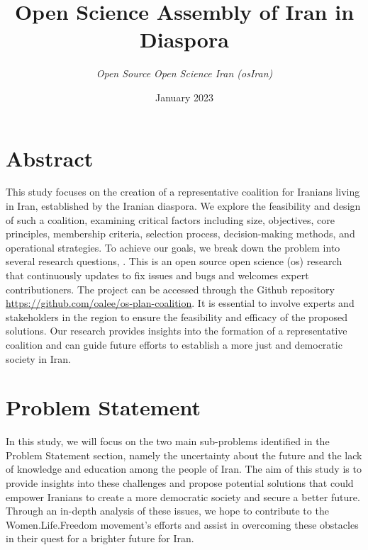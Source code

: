 \documentclass{IEEEtran}
\title{ \Huge \textbf{Open Science Assembly of Iran in Diaspora} \\[0.5cm]}
\author{

\textit{Open Source Open Science Iran (osIran)} \\
}
\date{January 2023}
\newcommand{\note}[1]{\todo[inline]{#1}}
\begin{document}
\maketitle




\section{Abstract}
This study focuses on the creation of a representative coalition for Iranians living in Iran, established by the Iranian diaspora.
We explore the feasibility and design of such a coalition, examining critical factors including size, objectives, core principles, membership criteria, selection process, decision-making methods, and operational strategies.
To achieve our goals, we break down the problem into several research questions, .
This is an open source open science (os) research that continuously updates to fix issues and bugs and welcomes expert contributioners.
The project can be accessed through the Github repository \url{https://github.com/oalee/os-plan-coalition}. 
It is essential to involve experts and stakeholders in the region to ensure the feasibility and efficacy of the proposed solutions. 
Our research provides insights into the formation of a representative coalition and can guide future efforts to establish a more just and democratic society in Iran.




\section{Problem Statement}
In this study, we will focus on the two main sub-problems identified in the Problem Statement section, namely the uncertainty about the future and the lack of knowledge and education among the people of Iran. The aim of this study is to provide insights into these challenges and propose potential solutions that could empower Iranians to create a more democratic society and secure a better future. Through an in-depth analysis of these issues, we hope to contribute to the Women.Life.Freedom movement's efforts and assist in overcoming these obstacles in their quest for a brighter future for Iran.
\end{document}
